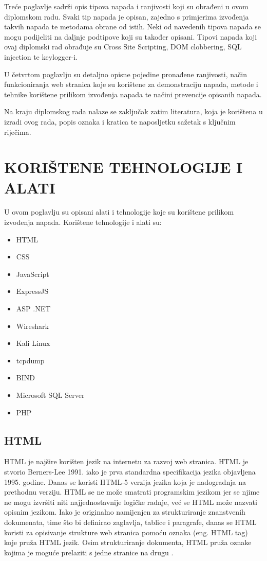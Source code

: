 \documentclass[12pt, oneside, onecolumn]{book}
\begin{document}
{Treće poglavlje sadrži opis tipova napada i ranjivosti koji su obrađeni u ovom diplomskom radu. Svaki tip napada je opisan, zajedno s primjerima izvođenja takvih napada te metodama obrane od istih. Neki od navedenih tipova napada se mogu podijeliti na daljnje podtipove koji su također opisani. Tipovi napada koji ovaj diplomski rad obrađuje su Cross Site Scripting, DOM clobbering, SQL injection te keylogger-i.

U četvrtom poglavlju su detaljno opisne pojedine pronađene ranjivosti, način funkcioniranja web stranica koje su korištene za demonstraciju napada, metode i tehnike korištene prilikom izvođenja napada te načini prevencije opisanih napada.

Na kraju diplomskog rada nalaze se zaključak zatim literatura, koja je korištena u izradi ovog rada, popis oznaka i kratica te naposljetku sažetak s ključnim riječima.

\chapter{KORIŠTENE TEHNOLOGIJE I ALATI}
U ovom poglavlju su opisani alati i tehnologije koje su korištene prilikom izvođenja napada. Korištene tehnologije i alati su: 

\begin{itemize}
\item HTML
\item CSS
\item JavaScript
\item ExpressJS
\item ASP .NET
\item Wireshark
\item Kali Linux
\item tcpdump
\item BIND
\item Microsoft SQL Server
\item PHP
\end{itemize}

\section{HTML}
HTML je najšire korišten jezik na internetu za razvoj web stranica. HTML je stvorio Berners-Lee 1991. iako je prva standardna specifikacija jezika objavljena 1995. godine.
Danas se koristi HTML-5 verzija jezika koja je nadogradnja na prethodnu verziju. HTML se ne može smatrati programskim jezikom jer se njime ne mogu izvršiti niti najjednostavnije logičke radnje, već se HTML može nazvati opisnim jezikom. Iako je originalno namijenjen za strukturiranje znanstvenih dokumenata, time što bi definirao zaglavlja, tablice i paragrafe, danas se HTML koristi za opisivanje strukture web stranica pomoću oznaka (eng. HTML tag) koje pruža HTML jezik. Osim strukturiranje dokumenta, HTML pruža oznake kojima je moguće prelaziti s jedne stranice na drugu \cite{html}.

}
\end{document}
